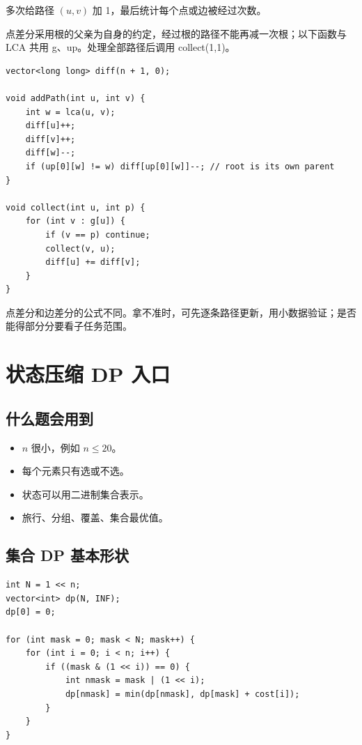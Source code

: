 多次给路径 $(u,v)$ 加 1，最后统计每个点或边被经过次数。

点差分采用根的父亲为自身的约定，经过根的路径不能再减一次根；以下函数与 LCA 共用 g、up。处理全部路径后调用 collect(1,1)。

\begin{lstlisting}
vector<long long> diff(n + 1, 0);

void addPath(int u, int v) {
    int w = lca(u, v);
    diff[u]++;
    diff[v]++;
    diff[w]--;
    if (up[0][w] != w) diff[up[0][w]]--; // root is its own parent
}

void collect(int u, int p) {
    for (int v : g[u]) {
        if (v == p) continue;
        collect(v, u);
        diff[u] += diff[v];
    }
}
\end{lstlisting}

点差分和边差分的公式不同。拿不准时，可先逐条路径更新，用小数据验证；是否能得部分分要看子任务范围。

\section{状态压缩 DP 入口}\label{sec:08-12}

\subsection{什么题会用到}

\begin{itemize}
  \item $n$ 很小，例如 $n \le 20$。
  \item 每个元素只有选或不选。
  \item 状态可以用二进制集合表示。
  \item 旅行、分组、覆盖、集合最优值。
\end{itemize}

\subsection{集合 DP 基本形状}

\begin{lstlisting}
int N = 1 << n;
vector<int> dp(N, INF);
dp[0] = 0;

for (int mask = 0; mask < N; mask++) {
    for (int i = 0; i < n; i++) {
        if ((mask & (1 << i)) == 0) {
            int nmask = mask | (1 << i);
            dp[nmask] = min(dp[nmask], dp[mask] + cost[i]);
        }
    }
}
\end{lstlisting}

